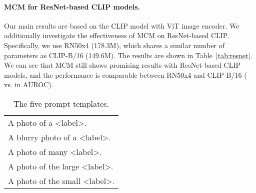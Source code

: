 \documentclass{article}
\begin{document}
\paragraph{MCM for ResNet-based CLIP models.}
Our main results are based on the CLIP model with ViT image encoder. We additionally investigate the effectiveness of MCM on ResNet-based CLIP. Specifically, we use RN50x4 (178.3M), which shares a similar number of parameters as CLIP-B/16 (149.6M). The results are shown in Table~\ref{tab:resnet}.
We can see that MCM still shows promising results with ResNet-based CLIP models, and the performance is comparable between RN50x4 and CLIP-B/16  ( vs.  in AUROC).
\begin{table}[hbt]
\caption{Comparison with ResNet-based CLIP models on ImageNet-1k (ID).}
\label{tab:resnet}
\centering
{}
\end{table}



\begin{wraptable}{r}{5cm}
\small
\vspace{-3mm}
\begin{tabular}{l}
\toprule
A photo of a <label>.\\
A blurry photo of a <label>.\\
A photo of many <label>.\\
A photo of the large <label>.\\
A photo of the small <label>.\\
\bottomrule
\end{tabular}
\caption{The five prompt templates.}
\label{tab:prompt}
\vspace{-3mm}
\end{wraptable}
\end{document}
